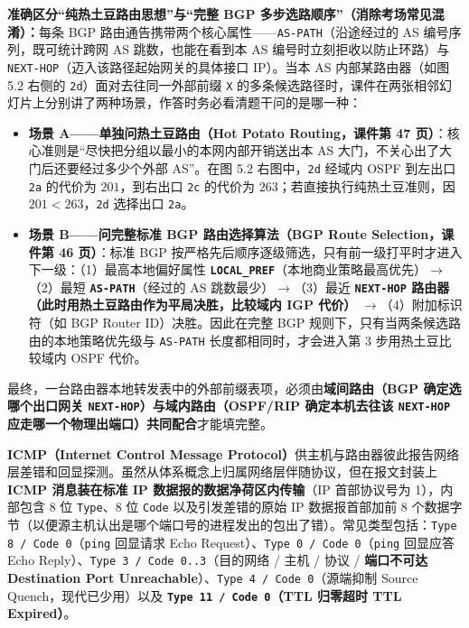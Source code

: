 \textbf{准确区分“纯热土豆路由思想”与“完整 BGP 多步选路顺序”（消除考场常见混淆）：}每条 BGP 路由通告携带两个核心属性——\texttt{AS-PATH}（沿途经过的 AS 编号序列，既可统计跨网 AS 跳数，也能在看到本 AS 编号时立刻拒收以防止环路）与 \texttt{NEXT-HOP}（迈入该路径起始网关的具体接口 IP）。当本 AS 内部某路由器（如图 5.2 右侧的 \texttt{2d}）面对去往同一外部前缀 \texttt{X} 的多条候选路径时，课件在两张相邻幻灯片上分别讲了两种场景，作答时务必看清题干问的是哪一种：
\begin{itemize}
\item \textbf{场景 A——单独问热土豆路由（Hot Potato Routing，课件第 47 页）}：核心准则是“尽快把分组以最小的本网内部开销送出本 AS 大门，不关心出了大门后还要经过多少个外部 AS”。在图 5.2 右图中，\texttt{2d} 经域内 OSPF 到左出口 \texttt{2a} 的代价为 $201$，到右出口 \texttt{2c} 的代价为 $263$；若直接执行纯热土豆准则，因 $201 < 263$，\texttt{2d} 选择出口 \texttt{2a}。
\item \textbf{场景 B——问完整标准 BGP 路由选择算法（BGP Route Selection，课件第 46 页）}：标准 BGP 按严格先后顺序逐级筛选，只有前一级打平时才进入下一级：（1）最高本地偏好属性 \textbf{\texttt{LOCAL\_PREF}}（本地商业策略最高优先）$\to$（2）最短 \textbf{\texttt{AS-PATH}}（经过的 AS 跳数最少）$\to$（3）最近 \textbf{\texttt{NEXT-HOP} 路由器（此时用热土豆路由作为平局决胜，比较域内 IGP 代价）} $\to$（4）附加标识符（如 BGP Router ID）决胜。因此在完整 BGP 规则下，只有当两条候选路由的本地策略优先级与 \texttt{AS-PATH} 长度都相同时，才会进入第 3 步用热土豆比较域内 OSPF 代价。
\end{itemize}

最终，一台路由器本地转发表中的外部前缀表项，必须由\textbf{域间路由（BGP 确定选哪个出口网关 \texttt{NEXT-HOP}）与域内路由（OSPF/RIP 确定本机去往该 \texttt{NEXT-HOP} 应走哪一个物理出端口）共同配合}才能填完整。



\textbf{ICMP（Internet Control Message Protocol）}供主机与路由器彼此报告网络层差错和回显探测。虽然从体系概念上归属网络层伴随协议，但在报文封装上 \textbf{ICMP 消息装在标准 IP 数据报的数据净荷区内传输}（IP 首部协议号为 1），内部包含 8 位 \texttt{Type}、8 位 \texttt{Code} 以及引发差错的原始 IP 数据报首部加前 8 个数据字节（以便源主机认出是哪个端口号的进程发出的包出了错）。常见类型包括：\texttt{Type 8 / Code 0}（\texttt{ping} 回显请求 Echo Request）、\texttt{Type 0 / Code 0}（\texttt{ping} 回显应答 Echo Reply）、\texttt{Type 3 / Code 0..3}（目的网络 / 主机 / 协议 / \textbf{端口不可达 Destination Port Unreachable}）、\texttt{Type 4 / Code 0}（源端抑制 Source Quench，现代已少用）以及 \textbf{\texttt{Type 11 / Code 0}（TTL 归零超时 TTL Expired）}。

